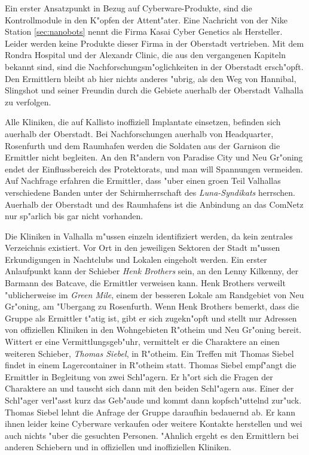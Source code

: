 Ein erster Ansatzpunkt in Bezug auf Cyberware-Produkte, sind die Kontrollmodule in den K"opfen der Attent"ater. Eine Nachricht von der Nike Station \cref{sec:nanobots} nennt die Firma Kasai Cyber Genetics als Hersteller. Leider werden keine Produkte dieser Firma in der Oberstadt vertrieben. Mit dem Rondra Hospital und der Alexandr Clinic, die aus den vergangenen Kapiteln bekannt sind, sind die Nachforschungsm"oglichkeiten in der Oberstadt ersch"opft. Den Ermittlern bleibt ab hier nichts anderes "ubrig, als den Weg von Hannibal, Slingshot und seiner Freundin durch die Gebiete au\3erhalb der Oberstadt Valhalla zu verfolgen.

Alle Kliniken, die auf Kallisto inoffiziell Implantate einsetzen, befinden sich au\3erhalb der Oberstadt. Bei Nachforschungen au\3erhalb von Headquarter, Rosenfurth und dem Raumhafen werden die Soldaten aus der Garnison die Ermittler nicht begleiten. An den R"andern von Paradise City und Neu Gr"oning endet der Einflussbereich des Protektorats, und man will Spannungen vermeiden. Auf Nachfrage erfahren die Ermittler, dass "uber einen gro\3en Teil Valhallas verschiedene Banden unter der Schirmherrschaft des \emph{Luna-Syndikats} herrschen. Au\3erhalb der Oberstadt und des Raumhafens ist die Anbindung an das ComNetz nur sp"arlich bis gar nicht vorhanden.

Die Kliniken in Valhalla m"ussen einzeln identifiziert werden, da kein zentrales Verzeichnis existiert. Vor Ort in den jeweiligen Sektoren der Stadt m"ussen Erkundigungen in Nachtclubs und Lokalen eingeholt werden. Ein erster Anlaufpunkt kann der Schieber \emph{Henk Brothers} sein, an den Lenny Kilkenny, der Barmann des Batcave, die Ermittler verweisen kann. Henk Brothers verweilt "ublicherweise im \emph{Green Mile}, einem der besseren Lokale am Randgebiet von Neu Gr"oning, am "Ubergang zu Rosenfurth. Wenn Henk Brothers bemerkt, dass die Gruppe als Ermittler t"atig ist, gibt er sich zugekn"opft und stellt nur Adressen von offiziellen Kliniken in den Wohngebieten R"otheim und Neu Gr"oning bereit. Wittert er eine Vermittlungsgeb"uhr, vermittelt er die Charaktere an einen weiteren Schieber, \emph{Thomas Siebel}, in R"otheim. Ein Treffen mit Thomas Siebel findet in einem Lagercontainer in R"otheim statt. Thomas Siebel empf"angt die Ermittler in Begleitung von zwei Schl"agern. Er h"ort sich die Fragen der Charaktere an und tauscht sich dann mit den beiden Schl"agern aus. Einer der Schl"ager verl"asst kurz das Geb"aude und kommt dann kopfsch"uttelnd zur"uck. Thomas Siebel lehnt die Anfrage der Gruppe daraufhin bedauernd ab. Er kann ihnen leider keine Cyberware verkaufen oder weitere Kontakte herstellen und wei\3 auch nichts "uber die gesuchten Personen. "Ahnlich ergeht es den Ermittlern bei anderen Schiebern und in offiziellen und inoffiziellen Kliniken.

